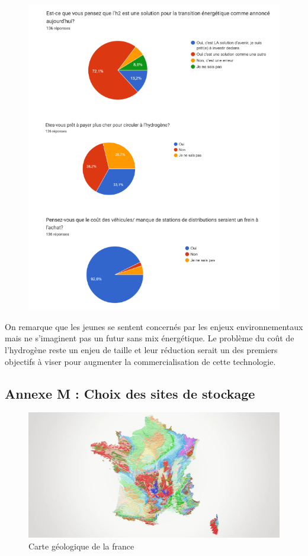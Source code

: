 \documentclass[11pt,french,a4paper]{article}
\begin{document}
\begin{figure}[h]
\centering
\includegraphics[width=0.8\linewidth]{image/annexe/annexeacceptabilite/graph4.png}
\end{figure}

On remarque que les jeunes se sentent concernés par les enjeux environnementaux mais ne s’imaginent pas un futur sans mix énergétique. Le problème du coût de l’hydrogène reste un enjeu de taille et leur réduction serait un des premiers objectifs à viser pour augmenter la commercialisation de cette technologie.


\FloatBarrier
\newpage
\subsection*{Annexe M : Choix des sites de stockage} 

\begin{figure}[h]
\centering
\includegraphics[width=0.8\linewidth]{image/annexe/chap4/carteGeolFr.png}
\caption{Carte géologique de la france \cite{InfoTerreCarte} }
\end{figure}
\end{document}
